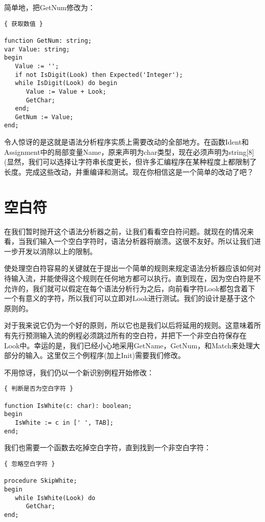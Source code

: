 简单地，把GetNum修改为：

\begin{verbatim}
{ 获取数值 }

function GetNum: string;
var Value: string;
begin
   Value := '';
   if not IsDigit(Look) then Expected('Integer');
   while IsDigit(Look) do begin
      Value := Value + Look;
      GetChar;
   end;
   GetNum := Value;
end;
\end{verbatim}

令人惊讶的是这就是语法分析程序实质上需要改动的全部地方。在函数Ident和Assignment中的局部变量Name，原来声明为char类型，现在必须声明为string[8](显然，我们可以选择让字符串长度更长，但许多汇编程序在某种程度上都限制了长度。完成这些改动，并重编译和测试。现在你相信这是一个简单的改动了吧？

\section{空白符}

在我们暂时抛开这个语法分析器之前，让我们看看空白符问题。就现在的情况来看，当我们输入一个空白字符时，语法分析器将崩溃。这很不友好。所以让我们进一步开发以消除以上的限制。

使处理空白符容易的关键就在于提出一个简单的规则来规定语法分析器应该如何对待输入流，并能使得这个规则在任何地方都可以执行。直到现在，因为空白符是不允许的，我们就可以假定在每个语法分析行为之后，向前看字符Look都包含着下一个有意义的字符，所以我们可以立即对Look进行测试。我们的设计是基于这个原则的。

对于我来说它仍为一个好的原则，所以它也是我们以后将延用的规则。这意味着所有先行预测输入流的例程必须跳过所有的空白符，并把下一个非空白符保存在Look中。幸运的是，我们已经小心地采用GetName，GetNum，和Match来处理大部分的输入。这里仅三个例程序(加上Init)需要我们修改。

不用惊讶，我们仍以一个新识别例程开始修改：

\begin{verbatim}
{ 判断是否为空白字符 }

function IsWhite(c: char): boolean;
begin
   IsWhite := c in [' ', TAB];
end;
\end{verbatim}

我们也需要一个函数去吃掉空白字符，直到找到一个非空白字符：

\begin{verbatim}
{ 忽略空白字符 }

procedure SkipWhite;
begin
   while IsWhite(Look) do
      GetChar;
end;
\end{verbatim}

